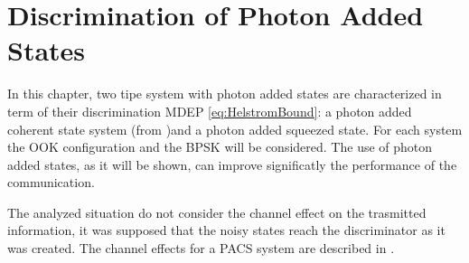 
\chapter{Discrimination of Photon Added States}
    In this chapter, two tipe system with photon added states are characterized in term of
    their discrimination MDEP \ref{eq:HelstromBound}: a photon added coherent state system 
    (from \cite{PACSDisc})and a photon added squeezed state. For each system the OOK
    configuration and the BPSK will be considered. 
    The use of photon added states, as it will be shown, can improve significatly the performance
    of the communication. 
    
    The analyzed situation do not consider the channel effect on the trasmitted information, it was
    supposed that the noisy states reach the discriminator as it was created. The channel effects
    for a PACS system are described in \cite{PACSDisc}.

    
    